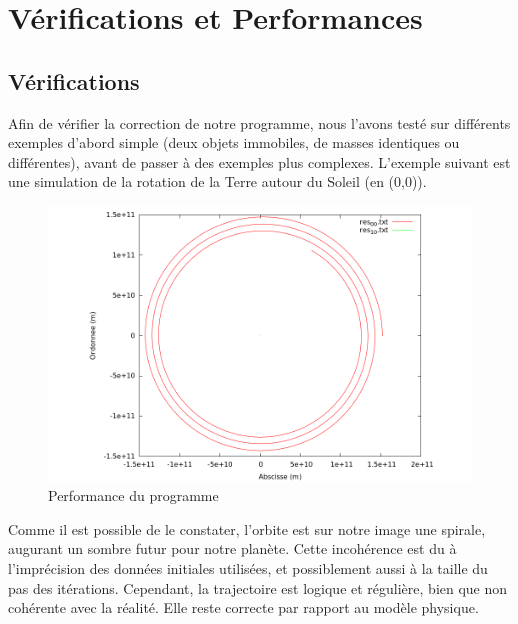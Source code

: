 \documentclass[a4paper,11pt]{article}
\begin{document}
 

\section{Vérifications et Performances}
\subsection{Vérifications}
Afin de vérifier la correction de notre programme, nous l'avons testé sur différents exemples d'abord simple (deux objets immobiles, de masses identiques ou différentes), avant de passer à des exemples plus complexes.
L'exemple suivant est une simulation de la rotation de la Terre autour du Soleil (en (0,0)).
\begin{figure}[h!]
  \centering
  \includegraphics[width=\textwidth]{orbite_terre.png}
  \caption{Performance du programme}
  \label{perf}
\end{figure}Comme il est possible de le constater, l'orbite est sur notre image une spirale, augurant un sombre futur pour notre planète. Cette incohérence est du à l'imprécision des données initiales utilisées, et possiblement aussi à la taille du pas des itérations.
Cependant, la trajectoire est logique et régulière, bien que non cohérente avec la réalité. Elle reste correcte par rapport au modèle physique.
\end{document}
